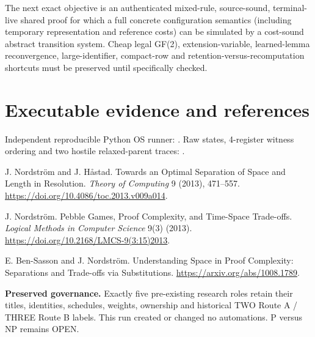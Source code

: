 \documentclass[11pt]{article}
\begin{document}
The next exact objective is an authenticated mixed-rule, source-sound, terminal-live shared proof for which a full concrete configuration semantics (including temporary representation and reference costs) can be simulated by a cost-sound abstract transition system. Cheap legal GF(2), extension-variable, learned-lemma reconvergence, large-identifier, compact-row and retention-versus-recomputation shortcuts must be preserved until specifically checked.

\section*{Executable evidence and references}
\noindent Independent reproducible Python OS runner:
.
Raw states, 4-register witness ordering and two hostile relaxed-parent traces:
.

\noindent [1] J. Nordstr\"om and J. H{\aa}stad. Towards an Optimal Separation of Space and Length in Resolution. \emph{Theory of Computing} 9 (2013), 471--557. \url{https://doi.org/10.4086/toc.2013.v009a014}.

\noindent [2] J. Nordstr\"om. Pebble Games, Proof Complexity, and Time-Space Trade-offs. \emph{Logical Methods in Computer Science} 9(3) (2013). \url{https://doi.org/10.2168/LMCS-9(3:15)2013}.

\noindent [3] E. Ben-Sasson and J. Nordstr\"om. Understanding Space in Proof Complexity: Separations and Trade-offs via Substitutions. \url{https://arxiv.org/abs/1008.1789}.

\noindent\textbf{Preserved governance.} Exactly five pre-existing research roles retain their titles, identities, schedules, weights, ownership and historical TWO Route A / THREE Route B labels. This run created or changed no automations. P versus NP remains OPEN.
\end{document}
